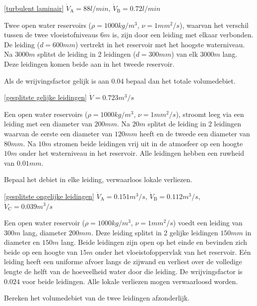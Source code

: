 \begin{antwoord}{\ref{turbulent laminair}}
	$\dot{V}_\mathrm{A} = 88\unit{l/min}$, $\dot{V}_\mathrm{B} = 0.72\unit{l/min}$
\end{antwoord}
\begin{toepassing}
	\label{gesplitste gelijke leidingen}
Twee open water reservoirs ($\rho=1000\unit{kg/m^3}$, $\nu=1\unit{mm^2/s}$), waarvan het verschil tussen de twee vloeistofniveaus $6\unit{m}$ is, zijn door een leiding met elkaar verbonden. De leiding ($d=600\unit{mm}$) vertrekt in het reservoir met het hoogste waterniveau. Na $3000\unit{m}$ splitst de leiding in 2 leidingen ($d=300\unit{mm}$) van elk $3000\unit{m}$ lang. Deze leidingen komen beide aan in het tweede reservoir. 
		
Als de wrijvingsfactor gelijk is aan $0.04$ bepaal dan het totale volumedebiet. 
\end{toepassing}
\begin{antwoord}{\ref{gesplitste gelijke leidingen}}
	$\dot{V} = 0.723\unit{m^3/s}$
\end{antwoord}
\begin{toepassing}[*]
	\label{gesplitste ongelijke leidingen}
Een open water reservoirs ($\rho=1000\unit{kg/m^3}$, $\nu=1\unit{mm^2/s}$), stroomt leeg via een leiding met een diameter van $200\unit{mm}$. Na $20\unit{m}$ splitst de leiding in 2 leidingen waarvan de eerste een diameter van $120\unit{mm}$ heeft en de tweede een diameter van $80\unit{mm}$. Na $10\unit{m}$ stromen beide leidingen vrij uit in de atmosfeer op een hoogte $10\unit{m}$ onder het waterniveau in het reservoir. Alle leidingen hebben een ruwheid van $0.01\unit{mm}$.

Bepaal het debiet in elke leiding, verwaarloos lokale verliezen.
\end{toepassing}
\begin{antwoord}{\ref{gesplitste ongelijke leidingen}}
	$\dot{V}_\mathrm{A} = 0.151\unit{m^3/s}$, $\dot{V}_\mathrm{B} = 0.112\unit{m^3/s}$,\\
	$\dot{V}_\mathrm{C} = 0.039\unit{m^3/s}$
\end{antwoord}
\begin{toepassing}
	\label{geperforeerde leiding debiet}
Een open water reservoir ($\rho=1000\unit{kg/m^3}$, $\nu=1\unit{mm^2/s}$) voedt een leiding van $300\unit{m}$ lang, diameter $200\unit{mm}$. Deze leiding splitst in 2 gelijke leidingen $150\unit{mm}$ in diameter en $150\unit{m}$ lang. Beide leidingen zijn open op het einde en bevinden zich beide op een hoogte van $15\unit{m}$ onder het vloeistofoppervlak van het reservoir. Eén leiding heeft een uniforme afvoer langs de zijwand en verliest over de volledige lengte de helft van de hoeveelheid water door die leiding. De wrijvingsfactor is $0.024$ voor beide leidingen. Alle lokale verliezen mogen verwaarloosd worden.
		
Bereken het volumedebiet van de twee leidingen afzonderlijk. 
\end{toepassing}
